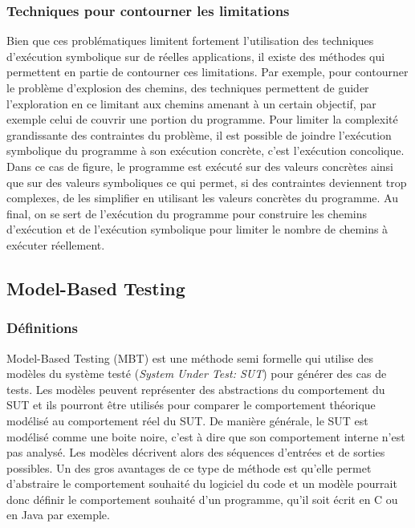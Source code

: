\subsubsection*{Techniques pour contourner les limitations}
Bien que ces problématiques limitent fortement l'utilisation des techniques d'exécution symbolique sur de réelles applications, il existe des méthodes qui permettent en partie de contourner ces limitations. 
Par exemple, pour contourner le problème d'explosion des chemins, des techniques permettent de guider l'exploration en ce limitant aux chemins amenant à un certain objectif, par exemple celui de couvrir une portion du programme.
Pour limiter la complexité grandissante des contraintes du problème, il est possible de joindre l'exécution symbolique du programme à son exécution concrète, c'est l'exécution concolique. Dans ce cas de figure, le programme est exécuté sur des valeurs concrètes ainsi que sur des valeurs symboliques ce qui permet, si des contraintes deviennent trop complexes, de les simplifier en utilisant les valeurs concrètes du programme. Au final, on se sert de l'exécution du programme pour construire les chemins d'exécution et de l'exécution symbolique pour limiter le nombre de chemins à exécuter réellement.

\subsection{Model-Based Testing}

\subsubsection*{Définitions}
Model-Based Testing (MBT) est une méthode semi formelle qui utilise des modèles du système testé (\textit{System Under Test: SUT}) pour générer des cas de tests.
Les modèles peuvent représenter des abstractions du comportement du SUT et ils pourront être utilisés pour comparer le comportement théorique modélisé au comportement réel du SUT.
De manière générale, le SUT est modélisé comme une boite noire, c'est à dire que son comportement interne n'est pas analysé. Les modèles décrivent alors des séquences d'entrées et de sorties possibles.
Un des gros avantages de ce type de méthode est qu'elle permet d'abstraire le comportement souhaité du logiciel du code et un modèle pourrait donc définir le comportement souhaité d'un programme, qu'il soit écrit en C ou en Java par exemple.

